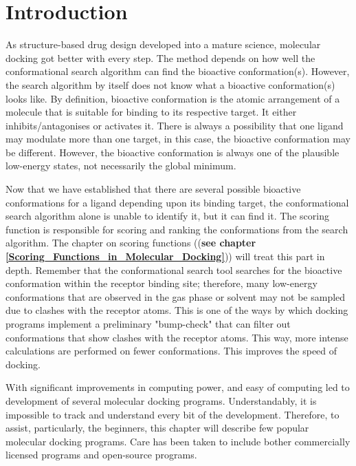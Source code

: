 \documentclass[11pt]{article}
\begin{document}
\section*{Introduction}
As structure-based drug design developed into a mature science, molecular docking got better with every step. The method depends on how well the conformational search algorithm can find the bioactive conformation(s). However, the search algorithm by itself does not know what a bioactive conformation(s) looks like. By definition, bioactive conformation is the atomic arrangement of a molecule that is suitable for binding to its respective target. It either inhibits/antagonises or activates it. There is always a possibility that one ligand may modulate more than one target, in this case, the bioactive conformation may be different. However, the bioactive conformation is always one of the plausible low-energy states, not necessarily the global minimum. 

Now that we have established that there are several possible bioactive conformations for a ligand depending upon its binding target, the conformational search algorithm alone is unable to identify it, but it can find it. The scoring function is responsible for scoring and ranking the conformations from the search algorithm. The chapter on scoring functions ((\textbf{see chapter \ref{Scoring_Functions_in_Molecular_Docking}})) will treat this part in depth. Remember that the conformational search tool searches for the bioactive conformation within the receptor binding site; therefore, many low-energy conformations that are observed in the gas phase or solvent may not be sampled due to clashes with the receptor atoms. This is one of the ways by which docking programs implement a preliminary "bump-check" that can filter out conformations that show clashes with the receptor atoms. This way, more intense calculations are performed on fewer conformations. This improves the speed of docking. 

With significant improvements in computing power, and easy of computing led to development of several molecular docking programs. Understandably, it is impossible to track and understand every bit of the development. Therefore, to assist, particularly, the beginners, this chapter will describe few popular molecular docking programs. Care has been taken to include bother commercially licensed programs and open-source programs. 
\end{document}
